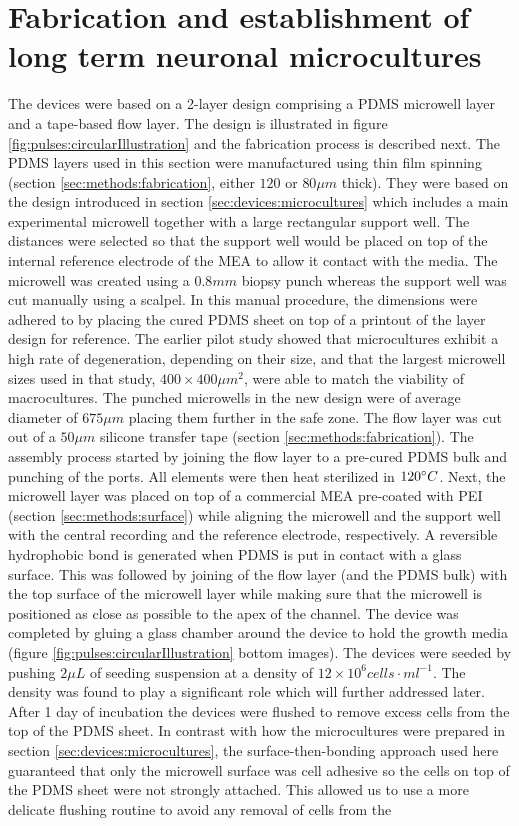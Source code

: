 \section{Fabrication and establishment of long term neuronal microcultures}
\label{sec:pulses:microcultures}
The devices were based on a 2-layer design comprising a PDMS microwell layer and a tape-based flow layer. The design is illustrated in figure \ref{fig:pulses:circularIllustration} and the fabrication process is described next. The PDMS layers used in this section were manufactured using thin film spinning (section \ref{sec:methods:fabrication}, either \(120\) or \(80 \mu m\) thick). They were based on the design introduced in section \ref{sec:devices:microcultures} which includes a main experimental microwell together with a large rectangular support well. The distances were selected so that the support well would be placed on top of the internal reference electrode of the MEA to allow it contact with the media. The microwell was created using a \(0.8 mm\) biopsy punch whereas the support well was cut manually using a scalpel. In this manual procedure, the dimensions were adhered to by placing the cured PDMS sheet on top of a printout of the layer design for reference. The earlier pilot study showed that microcultures exhibit a high rate of degeneration, depending on their size, and that the largest microwell sizes used in that study, \(400\times 400 \mu m^{2}\), were able to match the viability of macrocultures. The punched microwells in the new design were of average diameter of \(675 \mu m\) placing them further in the safe zone. The flow layer was cut out of a \(50 \mu m\) silicone transfer tape (section \ref{sec:methods:fabrication}). The assembly process started by joining the flow layer to a pre-cured PDMS bulk and punching of the ports. All elements were then heat sterilized in \(120\degree C\). Next, the microwell layer was placed on top of a commercial MEA pre-coated with PEI (section \ref{sec:methods:surface}) while aligning the microwell and the support well with the central recording and the reference electrode, respectively. A reversible hydrophobic bond is generated when PDMS is put in contact with a glass surface. This was followed by joining of the flow layer (and the PDMS bulk) with the top surface of the microwell layer while making sure that the microwell is positioned as close as possible to the apex of the channel. The device was completed by gluing a glass chamber around the device to hold the growth media (figure \ref{fig:pulses:circularIllustration} bottom images). The devices were seeded by pushing \(2 \mu L\) of seeding suspension at a density of \(12\times 10^{6} cells\cdot ml^{-1}\). The density was found to play a significant role which will further addressed later. After 1 day of incubation the devices were flushed to remove excess cells from the top of the PDMS sheet. In contrast with how the microcultures were prepared in section \ref{sec:devices:microcultures}, the surface-then-bonding approach used here guaranteed that only the microwell surface was cell adhesive so the cells on top of the PDMS sheet were not strongly attached. This allowed us to use a more delicate flushing routine to avoid any removal of cells from the 